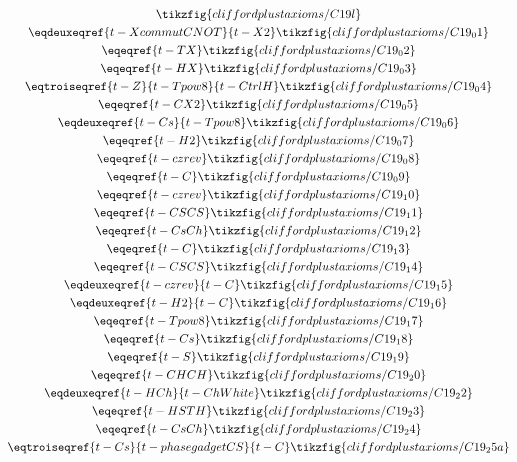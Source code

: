 \begin{derivation}\label{lem:t-C19-dec-eq}
\begin{gather*}
    \tikzfig{cliffordplustaxioms/C19l}\\
    \eqdeuxeqref{t-XcommutCNOT}{t-X2}\tikzfig{cliffordplustaxioms/C19_01}\\
    \eqeqref{t-TX}\tikzfig{cliffordplustaxioms/C19_02}\\
    \eqeqref{t-HX}\tikzfig{cliffordplustaxioms/C19_03}\\
    \eqtroiseqref{t-Z}{t-Tpow8}{t-CtrlH}\tikzfig{cliffordplustaxioms/C19_04}\\
    \eqeqref{t-CX2}\tikzfig{cliffordplustaxioms/C19_05}\\
    \eqdeuxeqref{t-Cs}{t-Tpow8}\tikzfig{cliffordplustaxioms/C19_06}\\
    \eqeqref{t-H2}\tikzfig{cliffordplustaxioms/C19_07}\\
    \eqeqref{t-czrev}\tikzfig{cliffordplustaxioms/C19_08}\\
    \eqeqref{t-C}\tikzfig{cliffordplustaxioms/C19_09}\\
    \eqeqref{t-czrev}\tikzfig{cliffordplustaxioms/C19_10}\\
    \eqeqref{t-CSCS}\tikzfig{cliffordplustaxioms/C19_11}\\
    \eqeqref{t-CsCh}\tikzfig{cliffordplustaxioms/C19_12}\\
    \eqeqref{t-C}\tikzfig{cliffordplustaxioms/C19_13}\\
    \eqeqref{t-CSCS}\tikzfig{cliffordplustaxioms/C19_14}\\
    \eqdeuxeqref{t-czrev}{t-C}\tikzfig{cliffordplustaxioms/C19_15}\\
    \eqdeuxeqref{t-H2}{t-C}\tikzfig{cliffordplustaxioms/C19_16}\\
    \eqeqref{t-Tpow8}\tikzfig{cliffordplustaxioms/C19_17}\\
    \eqeqref{t-Cs}\tikzfig{cliffordplustaxioms/C19_18}\\
    \eqeqref{t-S}\tikzfig{cliffordplustaxioms/C19_19}\\
    \eqeqref{t-CHCH}\tikzfig{cliffordplustaxioms/C19_20}\\
    \eqdeuxeqref{t-HCh}{t-ChWhite}\tikzfig{cliffordplustaxioms/C19_22}\\
    \eqeqref{t-HSTH}\tikzfig{cliffordplustaxioms/C19_23}\\
    \eqeqref{t-CsCh}\tikzfig{cliffordplustaxioms/C19_24}\\
    \eqtroiseqref{t-Cs}{t-phasegadgetCS}{t-C}\tikzfig{cliffordplustaxioms/C19_25a}\\

\end{gather*}
\end{derivation}
